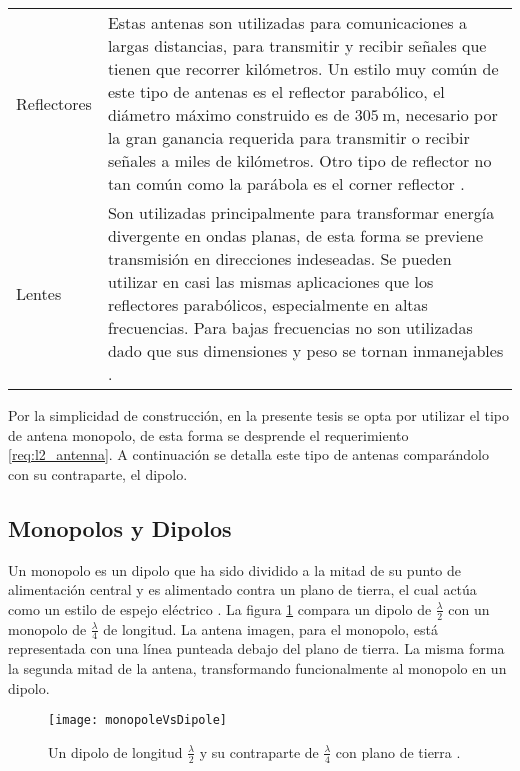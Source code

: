\begin{table}[H]
\begin{tabular}{l p{12.5cm}}
  Reflectores & Estas antenas son utilizadas para comunicaciones a largas distancias, para transmitir y recibir señales que tienen que recorrer kilómetros. Un estilo muy común de este tipo de antenas es el reflector parabólico, el diámetro máximo construido es de $\SI{305}{\meter}$, necesario por la gran ganancia requerida para transmitir o recibir señales a miles de kilómetros. Otro tipo de reflector no tan común como la parábola es el corner reflector \cite{Balanis2012}. \tabularnewline

  Lentes & Son utilizadas principalmente para transformar energía divergente en ondas planas, de esta forma se previene  transmisión en direcciones indeseadas. Se pueden utilizar en casi las mismas aplicaciones que los reflectores parabólicos, especialmente en altas frecuencias. Para bajas frecuencias no son utilizadas dado que sus dimensiones y peso se tornan inmanejables \cite{Balanis2012}. \tabularnewline
  \bottomrule 
  \end{tabular}
  \label{tab:type_antennas}
\end{table}

Por la simplicidad de construcción, en la presente tesis se opta por utilizar el tipo de antena monopolo, de esta forma se desprende el requerimiento \ref{req:l2_antenna}. A continuación se detalla este tipo de antenas comparándolo con su contraparte, el dipolo.


\subsection{Monopolos y Dipolos}

Un monopolo es un dipolo que ha sido dividido a la mitad de su punto de alimentación central y es alimentado contra un plano de tierra, el cual actúa como un estilo de espejo eléctrico \cite{arrl2007}. La figura \ref{fig:monopoles} compara un dipolo de $\frac{\lambda}{2}$ con un monopolo de $\frac{\lambda}{4}$ de longitud. La antena imagen, para el monopolo, está representada con una línea punteada debajo del plano de tierra. La misma forma la segunda mitad de la antena, transformando funcionalmente al monopolo en un dipolo.

\begin{figure}
 \centering
 \texttt{[image: monopoleVsDipole]}
 \caption{Un dipolo de longitud $\frac{\lambda}{2}$ y su contraparte de $\frac{\lambda}{4}$ con plano de tierra \cite{arrl2007}.}
 \label{fig:monopoles}
\end{figure}

